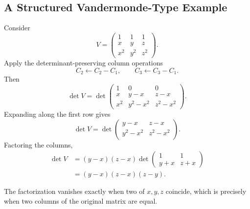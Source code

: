 \subsection{A Structured Vandermonde-Type Example}

Consider
\[
V=\begin{pmatrix}
1&1&1\\x&y&z\\x^2&y^2&z^2
\end{pmatrix}.
\]
Apply the determinant-preserving column operations
\[
C_2\leftarrow C_2-C_1,
\qquad
C_3\leftarrow C_3-C_1.
\]
Then
\[
\det V=
\det\begin{pmatrix}
1&0&0\\x&y-x&z-x\\x^2&y^2-x^2&z^2-x^2
\end{pmatrix}.
\]
Expanding along the first row gives
\[
\det V=
\det\begin{pmatrix}
y-x&z-x\\y^2-x^2&z^2-x^2
\end{pmatrix}.
\]
Factoring the columns,
\begin{align*}
\det V
&=(y-x)(z-x)
\det\begin{pmatrix}1&1\\y+x&z+x\end{pmatrix}\\
&=(y-x)(z-x)(z-y).
\end{align*}

\begin{interpretationbox}
The factorization vanishes exactly when two of $x,y,z$ coincide, which is precisely when two columns of the original matrix are equal.
\end{interpretationbox}
